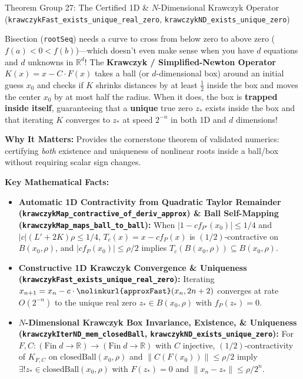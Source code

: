 \documentclass[11pt,a4paper]{article}
\newcommand{\R}{\ensuremath{\mathbb{R}}}
\newcommand{\lean}[1]{\texttt{\nolinkurl{#1}}}
\begin{document}
\vspace{6pt}

\begin{thmcard}{Theorem Group 27: The Certified 1D \& \texorpdfstring{$N$}{N}-Dimensional Krawczyk Operator (\texorpdfstring{\lean{krawczykFast_exists_unique_real_zero}, \lean{krawczykND_exists_unique_zero}}{krawczykFast\_exists\_unique\_real\_zero, krawczykND\_exists\_unique\_zero})}
\begin{eli5box}
Bisection (\lean{rootSeq}) needs a curve to cross from below zero to above zero ($f(a) < 0 < f(b)$)---which doesn't even make sense when you have $d$ equations and $d$ unknowns in $\R^d$! The \textbf{Krawczyk / Simplified-Newton Operator} $K(x) = x - C \cdot F(x)$ takes a ball (or $d$-dimensional box) around an initial guess $x_0$ and checks if $K$ shrinks distances by at least $\frac{1}{2}$ inside the box and moves the center $x_0$ by at most half the radius. When it does, the box is \textbf{trapped inside itself}, guaranteeing that a \textbf{unique} true zero $z_*$ exists inside the box and that iterating $K$ converges to $z_*$ at speed $2^{-n}$ in both 1D and $d$ dimensions!
\end{eli5box}

\textbf{Why It Matters:}
Provides the cornerstone theorem of validated numerics: certifying \emph{both} existence and uniqueness of nonlinear roots inside a ball/box without requiring scalar sign changes.

\textbf{Key Mathematical Facts:}
\begin{itemize}
  \item \textbf{Automatic 1D Contractivity from Quadratic Taylor Remainder (\lean{krawczykMap_contractive_of_deriv_approx}) \& Ball Self-Mapping (\lean{krawczykMap_maps_ball_to_ball}):} When $|1 - c f_{P'}(x_0)| \le 1/4$ and $|c|(L' + 2K)\rho \le 1/4$, $T_c(x) = x - c f_P(x)$ is $(1/2)$-contractive on $B(x_0, \rho)$, and $|c f_P(x_0)| \le \rho/2$ implies $T_c(B(x_0, \rho)) \subseteq B(x_0, \rho)$.
  \item \textbf{Constructive 1D Krawczyk Convergence \& Uniqueness (\lean{krawczykFast_exists_unique_real_zero}):} Iterating $x_{n+1} = x_n - c \cdot \lean{approxFast}(x_n, 2n+2)$ converges at rate $O(2^{-n})$ to the unique real zero $z_* \in B(x_0, \rho)$ with $f_P(z_*) = 0$.
  \item \textbf{$N$-Dimensional Krawczyk Box Invariance, Existence, \& Uniqueness (\lean{krawczykIterND_mem_closedBall}, \lean{krawczykND_exists_unique_zero}):} For $F, C : (\mathrm{Fin}\;d \to \R) \to (\mathrm{Fin}\;d \to \R)$ with $C$ injective, $(1/2)$-contractivity of $K_{F,C}$ on $\mathrm{closedBall}(x_0, \rho)$ and $\|C(F(x_0))\| \le \rho/2$ imply $\exists! z_* \in \mathrm{closedBall}(x_0, \rho)$ with $F(z_*) = 0$ and $\|x_n - z_*\| \le \rho / 2^n$.
\end{itemize}


\end{thmcard}
\end{document}
